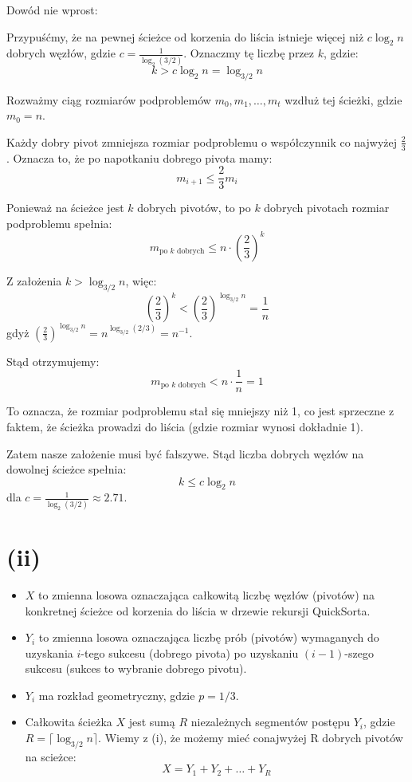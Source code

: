 Dowód nie wprost:

Przypuśćmy, że na pewnej ścieżce od korzenia do liścia istnieje więcej niż \(c \log_2 n\) dobrych węzłów, gdzie \(c = \frac{1}{\log_2 (3/2)}\). Oznaczmy tę liczbę przez \(k\), gdzie:
\[
	k > c \log_2 n = \log_{3/2} n
\]

Rozważmy ciąg rozmiarów podproblemów \(m_0, m_1, \dots, m_t\) wzdłuż tej ścieżki, gdzie \(m_0 = n\).

Każdy dobry pivot zmniejsza rozmiar podproblemu o współczynnik co najwyżej \(\frac{2}{3}\). Oznacza to, że po napotkaniu dobrego pivota mamy:
\[
	m_{i+1} \le \frac{2}{3} m_i
\]

Ponieważ na ścieżce jest \(k\) dobrych pivotów, to po \(k\) dobrych pivotach rozmiar podproblemu spełnia:
\[
	m_{\text{po } k \text{ dobrych}} \le n \cdot \left(\frac{2}{3}\right)^k
\]

Z założenia \(k > \log_{3/2} n\), więc:
\[
	\left(\frac{2}{3}\right)^k < \left(\frac{2}{3}\right)^{\log_{3/2} n} = \frac{1}{n}
\]
gdyż \(\left(\frac{2}{3}\right)^{\log_{3/2} n} = n^{\log_{3/2}(2/3)} = n^{-1}\).

Stąd otrzymujemy:
\[
	m_{\text{po } k \text{ dobrych}} < n \cdot \frac{1}{n} = 1
\]

To oznacza, że rozmiar podproblemu stał się mniejszy niż 1, co jest sprzeczne z faktem, że ścieżka prowadzi do liścia (gdzie rozmiar wynosi dokładnie 1).

Zatem nasze założenie musi być fałszywe. Stąd liczba dobrych węzłów na dowolnej ścieżce spełnia:
\[
	k \le c \log_2 n
\]
dla \(c = \frac{1}{\log_2 (3/2)} \approx 2.71\).
\section*{(ii)}


\begin{itemize}
	\item  \(X\) to zmienna losowa oznaczająca całkowitą liczbę węzłów (pivotów) na konkretnej ścieżce od korzenia do liścia w drzewie rekursji QuickSorta.
	\item  \(Y_i\) to zmienna losowa oznaczająca liczbę prób (pivotów) wymaganych do uzyskania \(i\)-tego sukcesu (dobrego pivota) po uzyskaniu \((i-1)\)-szego sukcesu (sukces to wybranie dobrego pivotu).
	\item  \(Y_i\) ma rozkład geometryczny, gdzie \(p = 1/3\).
	\item Całkowita ścieżka \(X\) jest sumą \(R\) niezależnych segmentów postępu \(Y_i\), gdzie \(R = \lceil \log_{3/2} n \rceil\). Wiemy z (i), że możemy mieć conajwyżej R dobrych pivotów na scieżce:
	      \[X = Y_1 + Y_2 + \dots + Y_R\]
\end{itemize}



